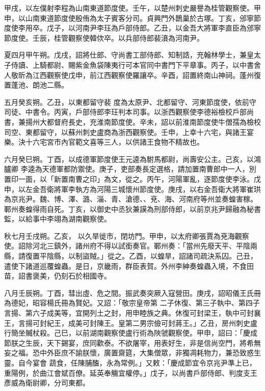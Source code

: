 \begin{pinyinscope}
 甲戌，以左僕射李程為山南東道節度使。壬午，以楚州刺史嚴譽為桂管觀察使。甲申，以山南東道節度使殷侑為太子賓客分司。貞興門外鵲巢於古塚。丁亥，邠寧節度使李用卒。戊子，以河南尹李玨為戶部侍郎。乙丑，以金吾大將軍李直臣為邠寧
 節度使。壬辰，桂管觀察使韓佽卒。以兵部侍郎裴濆為河南尹。



 夏四月甲午朔。戊戌，詔將仕郎、守尚書工部侍郎、知制誥，充翰林學士，兼皇太子侍讀、上騎都尉、賜紫金魚袋陳夷行可本官同中書門下平章事。丙子，以中書舍人敬昕為江西觀察使戊申，前江西觀察使羅讓卒。辛酉，詔置終南山神祠。蓬州復置蓬池、朗池二縣。



 五月癸亥朔。乙丑，以東都留守裴
 度為太原尹、北都留守、河東節度使，依前守司徒、中書令。丙寅，戶部侍郎李玨判本司事。以浙西觀察使李德裕檢校戶部尚書，兼揚州大都督府長史，充淮南節度使。辛未，詔以前淮南節度使牛僧孺為檢校司空、東都留守，以蘇州刺史盧商為浙西觀察使。壬申，上幸十六宅，與諸王宴樂。決十六宅宮市內官範文喜等三人，以供諸王食物不精故也。



 六月癸巳朔。丁酉，以成德軍節度使王元逵為駙馬都尉，尚壽安公主。己亥，以鴻臚卿
 李逵為天德軍都防禦使。庚子，吏部奏長定選格，請加置南曹郎中一人，別置印一面，以「新置南曹之印」為文，從之。丙午，河陽軍亂，逐節度使李泳。戊申，以左金吾衛將軍李執方為河陽三城懷州節度使。庚戌，以右金吾衛大將軍崔珙為京兆尹。魏、博、澤、潞、淄、青、滄德、、兗、海、河南府等州並奏蝗害稼。鄆州奏蝗得雨自死。丁亥，以御史中丞狄兼謨為刑部侍郎，以前京兆尹歸融為秘書監，以給事中李翊為湖南觀察使。



 秋七月壬戌朔。乙亥，
 以久旱徙市，閉坊門。甲申，以太府卿張賈為兗海觀察使。詔除河北三鎮外，諸州府不得以試銜奏官。鄆州奏：「當州先廢天平、平陰兩縣，請復置平陰縣，以制盜賊。」從之。乙酉，以蝗旱，詔諸司疏決系囚。己丑，遣使下諸道巡覆蝗蟲。是日，京畿雨，群臣表賀。外州李紳奏蝗蟲入境，不食田苗，詔書褒美，仍刻石於相國寺。



 八月壬辰朔。丁酉，彗出虛、危之間。振武奏突厥入寇營田。庚戌，詔昭儀王氏冊為德妃，昭容楊氏冊為賢妃。又詔：「敬宗皇帝第
 二子休復、第三子執中、第四子言揚、第六子成美等，宜開列土之封，用申睦族之典。休復可封梁王，執中可封襄王，言揚可封紀王，成美可封陳王。皇第二男宗儉可封蔣王。」乙丑，房州刺史盧行簡坐贓杖殺。己巳，以前湖南觀察使盧行術為陜虢觀察使。甲申，詔曰：「慶成節朕之生辰，天下錫宴，庶同歡泰。不欲屠宰，用表好生，非是信尚空門，將希無妄之福。恐中外臣庶不諭朕懷，廣置齋筵，大集僧眾，非獨凋耗物力，兼恐致惑生靈。自今宴會
 蔬食，任陳脯醢，永為常例。」又敕：「慶成節宜令京兆尹準上已，重陽例，於曲江會斌百僚。延英奉觴宜權停。」戊子，以尚書戶部侍郎、判度支王彥威為衛尉卿，分司東都。




\end{pinyinscope}
